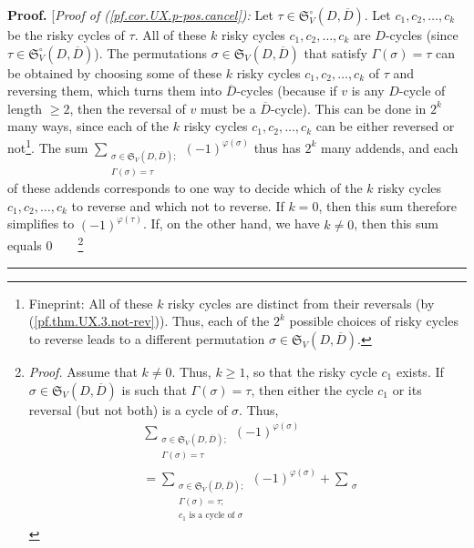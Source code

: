 \documentclass[numbers=enddot,12pt,final,onecolumn,notitlepage]{scrartcl}%
\numberwithin{exer}{section}
\theoremstyle{definition}
\newenvironment{proof}[1][Proof]{\noindent\textbf{#1.} }{\ \rule{0.5em}{0.5em}}
\let\sumnonlimits\sum
\renewcommand{\sum}{\sumnonlimits\limits}
\begin{document}
\begin{proof}
[\textit{Proof of (\ref{pf.cor.UX.p-pos.cancel}):} Let $\tau\in\mathfrak{S}%
_{V}^{\circ}\left(  D,\overline{D}\right)  $. Let $c_{1},c_{2},\ldots,c_{k}$
be the risky cycles of $\tau$. All of these $k$ risky cycles $c_{1}%
,c_{2},\ldots,c_{k}$ are $D$-cycles (since $\tau\in\mathfrak{S}_{V}^{\circ
}\left(  D,\overline{D}\right)  $). The permutations $\sigma\in\mathfrak{S}%
_{V}\left(  D,\overline{D}\right)  $ that satisfy $\Gamma\left(
\sigma\right)  =\tau$ can be obtained by choosing some of these $k$ risky
cycles $c_{1},c_{2},\ldots,c_{k}$ of $\tau$ and reversing them, which turns
them into $\overline{D}$-cycles (because if $v$ is any $D$-cycle of length
$\geq2$, then the reversal of $v$ must be a $\overline{D}$-cycle). This can be
done in $2^{k}$ many ways, since each of the $k$ risky cycles $c_{1}%
,c_{2},\ldots,c_{k}$ can be either reversed or not\footnote{Fineprint: All of
these $k$ risky cycles are distinct from their reversals (by
(\ref{pf.thm.UX.3.not-rev})). Thus, each of the $2^{k}$ possible choices of
risky cycles to reverse leads to a different permutation $\sigma
\in\mathfrak{S}_{V}\left(  D,\overline{D}\right)  $.}. The sum $\sum
_{\substack{\sigma\in\mathfrak{S}_{V}\left(  D,\overline{D}\right)
;\\\Gamma\left(  \sigma\right)  =\tau}}\left(  -1\right)  ^{\varphi\left(
\sigma\right)  }$ thus has $2^{k}$ many addends, and each of these addends
corresponds to one way to decide which of the $k$ risky cycles $c_{1}%
,c_{2},\ldots,c_{k}$ to reverse and which not to reverse. If $k=0$, then this
sum therefore simplifies to $\left(  -1\right)  ^{\varphi\left(  \tau\right)
}$. If, on the other hand, we have $k\neq0$, then this sum equals
$0$\ \ \ \ \footnote{\textit{Proof.} Assume that $k\neq0$. Thus, $k\geq1$, so
that the risky cycle $c_{1}$ exists. If $\sigma\in\mathfrak{S}_{V}\left(
D,\overline{D}\right)  $ is such that $\Gamma\left(  \sigma\right)  =\tau$,
then either the cycle $c_{1}$ or its reversal (but not both) is a cycle of
$\sigma$. Thus,
\begin{align}
&  \sum_{\substack{\sigma\in\mathfrak{S}_{V}\left(  D,\overline{D}\right)
;\\\Gamma\left(  \sigma\right)  =\tau}}\left(  -1\right)  ^{\varphi\left(
\sigma\right)  }\nonumber\\
&  =\sum_{\substack{\sigma\in\mathfrak{S}_{V}\left(  D,\overline{D}\right)
;\\\Gamma\left(  \sigma\right)  =\tau;\\c_{1}\text{ is a cycle of }\sigma
}}\left(  -1\right)  ^{\varphi\left(  \sigma\right)  }+\sum_{\substack{\sigma
}}
\end{align}}
\end{proof}
\end{document}
